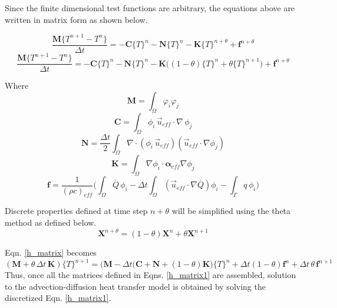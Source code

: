Since the finite dimensional test functions are arbitrary, the equations above are written in matrix form as shown below.

\begin{equation}	\label{h_matrix}
\frac{\mathbf{M}\{T^{n+1}-T^n\}}{\Delta t}=-\mathbf{C}\{T\}^n-\mathbf{N}\{T\}^n -\mathbf{K}\{T\}^{n+\theta}+\mathbf{f}^{n+\theta}
\end{equation}
%
\begin{equation}	
\frac{\mathbf{M}\{T^{n+1}-T^n\}}{\Delta t}=-\mathbf{C}\{T\}^n-\mathbf{N}\{T\}^n -\mathbf{K}\big((1-\theta)\{T\}^n+\theta\{T\}^{n+1} \big)+\mathbf{f}^{n+\theta}
\end{equation}

Where
\begin{equation}
\mathbf{M}=\int_{\Omega}\varphi_i\varphi_j 
\end{equation}
%
\begin{equation}
\mathbf{C}=\int_{\Omega}\phi_i\,\vec{u}_{eff}\cdot \nabla\,\phi_j	
\end{equation}
%
\begin{equation}
\mathbf{N}=\frac{\Delta t}{2}\int_{\Omega}\nabla\cdot(\phi_i\,\vec{u}_{eff})(\vec{u}_{eff}\cdot\nabla \phi_j)	
\end{equation}
%
\begin{equation}
\mathbf{K}=\int_{\Omega}\nabla \phi_i\cdot\mathbf{\alpha}_{eff}\nabla \phi_j	
\end{equation}
%
\newline
\begin{equation}
\mathbf{f}=\frac{1}{(\rho c )_{eff}}\Big(\int_{\Omega}\bar{Q}\,\phi_i- \Delta t\int_{\Omega}(\vec{u}_{eff}\cdot  \nabla\bar{Q})\phi_i-\int_{\Gamma}q\,\phi_i\Big)	
\end{equation}

Discrete properties defined at time step $n+\theta$ will be simplified using the theta method as defined below. 
\begin{equation}
\mathbf{X}^{n+\theta}=(1-\theta)\mathbf{X}^n+\theta\mathbf{X}^{n+1}
\end{equation}

Eqn. \ref{h_matrix} becomes
%
\begin{equation}	\label{h_matrix1}
(\mathbf{M}+\theta\,\Delta t\,\mathbf{K}) \{T\}^{n+1}=\big(\mathbf{M}-\Delta t\big(\mathbf{C}+\mathbf{N} +(1-\theta)\mathbf{K}\big) \{T\}^n +\Delta t(1-\theta)\mathbf{f}^n +\Delta t\,\theta\,\mathbf{f}^{n+1}
\end{equation}
Thus, once all the matrices defined in Eqns. \ref{h_matrix1} are assembled, solution to the advection-diffusion heat transfer model is obtained by solving the discretized Eqn. \ref{h_matrix1}. 
